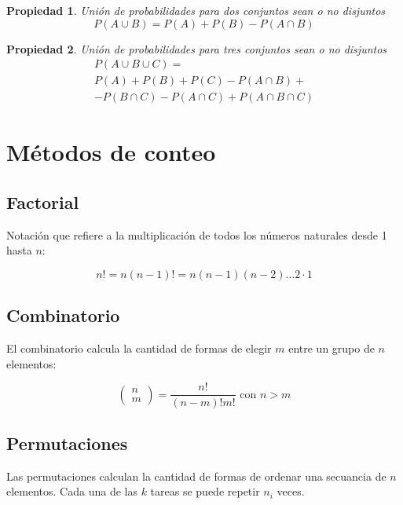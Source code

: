 \documentclass[a5paper,12pt,twoside]{book}
\newtheorem{prop}{{Propiedad}}[chapter]
\begin{document}
\begin{prop}
Unión de probabilidades para dos conjuntos sean o no disjuntos
\begin{equation}
P (A \cup B) = P(A) + P(B) - P(A \cap B)
\end{equation}
\end{prop}

\begin{prop}
Unión de probabilidades para tres conjuntos sean o no disjuntos
\begin{multline}
P (A \cup B \cup C) = \\
P(A) + P(B) + P(C) - P(A \cap B) +\\
- P(B \cap C) - P(A \cap C) + P(A \cap B \cap C)
\end{multline}
\end{prop}

\section{Métodos de conteo}

\subsection{Factorial}

Notación que refiere a la multiplicación de todos los números naturales desde 1 hasta $n$:

\begin{equation}
n!=n(n-1)!=n(n-1)(n-2) \dots 2 \cdot 1
\end{equation}

\subsection{Combinatorio}

El combinatorio calcula la cantidad de formas de elegir $m$ entre un grupo de $n$ elementos:

\begin{equation}
\begin{pmatrix}
n \\
m
\end{pmatrix}
= \dfrac{n!}{(n-m)!m!}
\text{ con } n>m
\end{equation}

\subsection{Permutaciones}

Las permutaciones calculan la cantidad de formas de ordenar una secuancia de $n$ elementos. Cada una de las $k$ tareas se puede repetir $n_i$ veces.
\end{document}
